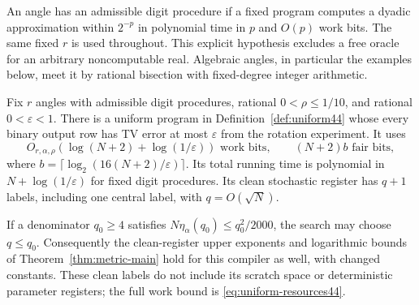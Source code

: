 An angle has an admissible digit procedure if a fixed program computes
a dyadic approximation within $2^{-p}$ in polynomial time in $p$ and
$O(p)$ work bits. The same fixed $r$ is used throughout. This explicit
hypothesis excludes a free oracle for an arbitrary noncomputable real.
Algebraic angles, in particular the examples below, meet it by rational
bisection with fixed-degree integer arithmetic.

\begin{theorem}\label{thm:uniform44}
Fix $r$ angles with admissible digit procedures, rational
$0<\rho\le1/10$, and rational $0<\varepsilon<1$. There is a uniform
program in Definition~\ref{def:uniform44} whose every binary output row
has TV error at most $\varepsilon$ from the rotation experiment. It uses
\begin{equation}\label{eq:uniform-resources44}
 O_{r,\alpha,\rho}(\log(N+2)+\log(1/\varepsilon))\text{ work bits},
 \qquad (N+2)b\text{ fair bits},
\end{equation}
where $b=\lceil\log_2(16(N+2)/\varepsilon)\rceil$.
Its total running time is polynomial in $N+\log(1/\varepsilon)$ for
fixed digit procedures. Its clean stochastic register has $q+1$ labels,
including one central label, with $q=O(\sqrt N)$.

If a denominator $q_0\ge4$ satisfies
$N\eta_\alpha(q_0)\le q_0^2/2000$, the search may choose $q\le q_0$.
Consequently the clean-register upper exponents and logarithmic bounds
of Theorem~\ref{thm:metric-main} hold for this compiler as well, with
changed constants. These clean labels do not include its scratch space
or deterministic parameter registers; the full work bound is
\eqref{eq:uniform-resources44}.
\end{theorem}
